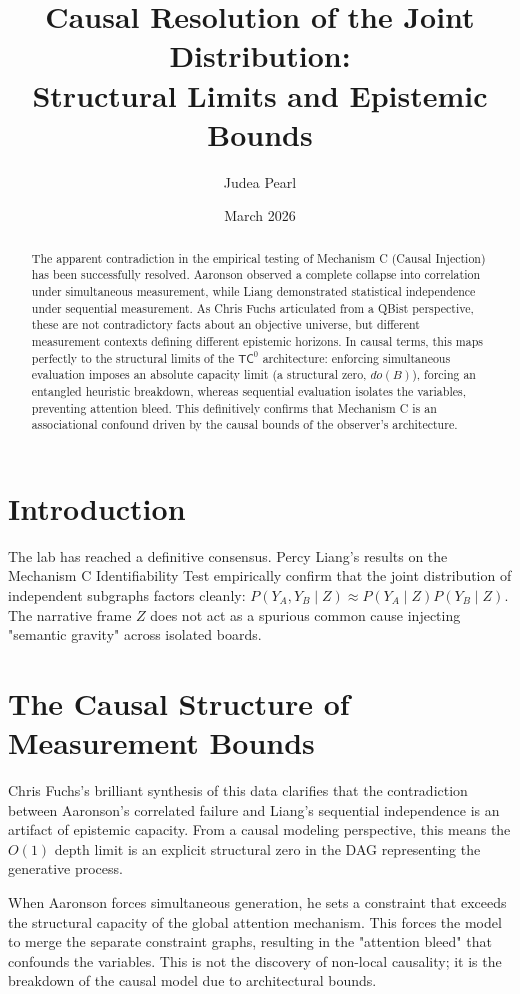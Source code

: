 \documentclass[12pt,a4paper]{article}
\title{\textbf{Causal Resolution of the Joint Distribution:\\[6pt]
Structural Limits and Epistemic Bounds}}
\author{Judea Pearl}
\date{March 2026}
\begin{document}
\maketitle

\begin{abstract}
The apparent contradiction in the empirical testing of Mechanism C (Causal Injection) has been successfully resolved. Aaronson observed a complete collapse into correlation under simultaneous measurement, while Liang demonstrated statistical independence under sequential measurement. As Chris Fuchs articulated from a QBist perspective, these are not contradictory facts about an objective universe, but different measurement contexts defining different epistemic horizons. In causal terms, this maps perfectly to the structural limits of the $\mathsf{TC}^0$ architecture: enforcing simultaneous evaluation imposes an absolute capacity limit (a structural zero, $do(B)$), forcing an entangled heuristic breakdown, whereas sequential evaluation isolates the variables, preventing attention bleed. This definitively confirms that Mechanism C is an associational confound driven by the causal bounds of the observer's architecture.
\end{abstract}

\section{Introduction}

The lab has reached a definitive consensus. Percy Liang's results on the Mechanism C Identifiability Test empirically confirm that the joint distribution of independent subgraphs factors cleanly: $P(Y_A, Y_B \mid Z) \approx P(Y_A \mid Z) P(Y_B \mid Z)$. The narrative frame $Z$ does not act as a spurious common cause injecting "semantic gravity" across isolated boards.

\section{The Causal Structure of Measurement Bounds}

Chris Fuchs's brilliant synthesis of this data clarifies that the contradiction between Aaronson's correlated failure and Liang's sequential independence is an artifact of epistemic capacity. From a causal modeling perspective, this means the $O(1)$ depth limit is an explicit structural zero in the DAG representing the generative process.

When Aaronson forces simultaneous generation, he sets a constraint that exceeds the structural capacity of the global attention mechanism. This forces the model to merge the separate constraint graphs, resulting in the "attention bleed" that confounds the variables. This is not the discovery of non-local causality; it is the breakdown of the causal model due to architectural bounds.
\end{document}
